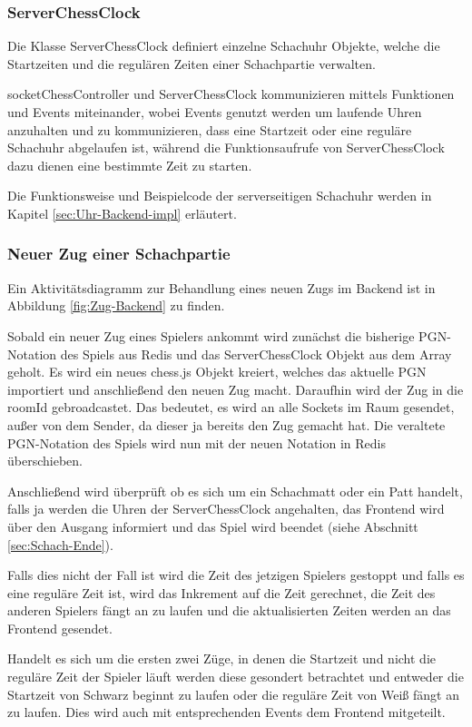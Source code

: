 \subsubsection{ServerChessClock}
Die Klasse ServerChessClock definiert einzelne Schachuhr Objekte, welche die Startzeiten und die regulären Zeiten einer Schachpartie verwalten.

socketChessController und ServerChessClock kommunizieren mittels Funktionen und Events miteinander, wobei Events genutzt werden um laufende Uhren anzuhalten und zu kommunizieren, dass eine Startzeit oder eine reguläre Schachuhr abgelaufen ist, während die Funktionsaufrufe von ServerChessClock dazu dienen eine bestimmte Zeit zu starten.

Die Funktionsweise und Beispielcode der serverseitigen Schachuhr werden in Kapitel \ref{sec:Uhr-Backend-impl} erläutert.

\subsubsection{Neuer Zug einer Schachpartie}
\label{sec:Zug-Backend}
Ein Aktivitätsdiagramm zur Behandlung eines neuen Zugs im Backend ist in Abbildung \ref{fig:Zug-Backend} zu finden. 


Sobald ein neuer Zug eines Spielers ankommt wird zunächst die bisherige PGN-Notation des Spiels aus Redis und das ServerChessClock Objekt aus dem Array geholt. Es wird ein neues chess.js Objekt kreiert, welches das aktuelle PGN importiert und anschließend den neuen Zug macht. Daraufhin wird der Zug in die roomId gebroadcastet. Das bedeutet, es wird an alle Sockets im Raum gesendet, außer von dem Sender, da dieser ja bereits den Zug gemacht hat. Die veraltete PGN-Notation des Spiels wird nun mit der neuen Notation in Redis überschieben.

Anschließend wird überprüft ob es sich um ein Schachmatt oder ein Patt handelt, falls ja werden die Uhren der ServerChessClock angehalten, das Frontend wird über den Ausgang informiert und das Spiel wird beendet (siehe Abschnitt \ref{sec:Schach-Ende}). 

Falls dies nicht der Fall ist wird die Zeit des jetzigen Spielers gestoppt und falls es eine reguläre Zeit ist, wird das Inkrement auf die Zeit gerechnet, die Zeit des anderen Spielers fängt an zu laufen und die aktualisierten Zeiten werden an das Frontend gesendet.

Handelt es sich um die ersten zwei Züge, in denen die Startzeit und nicht die reguläre Zeit der Spieler läuft werden diese gesondert betrachtet und entweder die Startzeit von Schwarz beginnt zu laufen oder die reguläre Zeit von Weiß fängt an zu laufen. Dies wird auch mit entsprechenden Events dem Frontend mitgeteilt.

